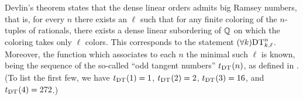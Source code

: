 


Devlin's theorem states that the dense linear orders admits big Ramsey numbers, that is, for every $n$ there exists an $\ell$ such that for any finite coloring of the $n$-tuples of rationals, there exists a dense linear subordering of $\mathbb{Q}$ on which the coloring takes only $\ell$ colors. This corresponds to the statement $(\forall k)\mathrm{DT}^{n}_{k,\ell}$. Moreover, the function which associates to each $n$ the minimal such $\ell$ is known, being the sequence of the so-called   ``odd tangent numbers'' $t_{\mathrm{DT}^{}_{}}(n)$, as defined in \cite[p.~147]{Todorcevic2010Ramsey}. (To list the first few, we have $t_{\mathrm{DT}^{}_{}}(1) = 1$, $t_{\mathrm{DT}^{}_{}}(2) = 2$, $t_{\mathrm{DT}^{}_{}}(3) = 16$, and $t_{\mathrm{DT}^{}_{}}(4) = 272$.)

